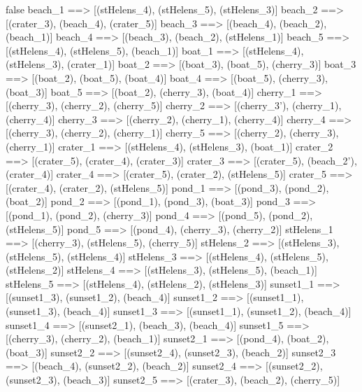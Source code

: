 \if false
beach_1 ==> [(stHelens_4), (stHelens_5), (stHelens_3)]
beach_2 ==> [(crater_3), (beach_4), (crater_5)]
beach_3 ==> [(beach_4), (beach_2), (beach_1)]
beach_4 ==> [(beach_3), (beach_2), (stHelens_1)]
beach_5 ==> [(stHelens_4), (stHelens_5), (beach_1)]
boat_1 ==> [(stHelens_4), (stHelens_3), (crater_1)]
boat_2 ==> [(boat_3), (boat_5), (cherry_3)]
boat_3 ==> [(boat_2), (boat_5), (boat_4)]
boat_4 ==> [(boat_5), (cherry_3), (boat_3)]
boat_5 ==> [(boat_2), (cherry_3), (boat_4)]
cherry_1 ==> [(cherry_3), (cherry_2), (cherry_5)]
cherry_2 ==> [(cherry_3'), (cherry_1), (cherry_4)]
cherry_3 ==> [(cherry_2), (cherry_1), (cherry_4)]
cherry_4 ==> [(cherry_3), (cherry_2), (cherry_1)]
cherry_5 ==> [(cherry_2), (cherry_3), (cherry_1)]
crater_1 ==> [(stHelens_4), (stHelens_3), (boat_1)]
crater_2 ==> [(crater_5), (crater_4), (crater_3)]
crater_3 ==> [(crater_5), (beach_2'), (crater_4)]
crater_4 ==> [(crater_5), (crater_2), (stHelens_5)]
crater_5 ==> [(crater_4), (crater_2), (stHelens_5)]
pond_1 ==> [(pond_3), (pond_2), (boat_2)]
pond_2 ==> [(pond_1), (pond_3), (boat_3)]
pond_3 ==> [(pond_1), (pond_2), (cherry_3)]
pond_4 ==> [(pond_5), (pond_2), (stHelens_5)]
pond_5 ==> [(pond_4), (cherry_3), (cherry_2)]
stHelens_1 ==> [(cherry_3), (stHelens_5), (cherry_5)]
stHelens_2 ==> [(stHelens_3), (stHelens_5), (stHelens_4)]
stHelens_3 ==> [(stHelens_4), (stHelens_5), (stHelens_2)]
stHelens_4 ==> [(stHelens_3), (stHelens_5), (beach_1)]
stHelens_5 ==> [(stHelens_4), (stHelens_2), (stHelens_3)]
sunset1_1 ==> [(sunset1_3), (sunset1_2), (beach_4)]
sunset1_2 ==> [(sunset1_1), (sunset1_3), (beach_4)]
sunset1_3 ==> [(sunset1_1), (sunset1_2), (beach_4)]
sunset1_4 ==> [(sunset2_1), (beach_3), (beach_4)]
sunset1_5 ==> [(cherry_3), (cherry_2), (beach_1)]
sunset2_1 ==> [(pond_4), (boat_2), (boat_3)]
sunset2_2 ==> [(sunset2_4), (sunset2_3), (beach_2)]
sunset2_3 ==> [(beach_4), (sunset2_2), (beach_2)]
sunset2_4 ==> [(sunset2_2), (sunset2_3), (beach_3)]
sunset2_5 ==> [(crater_3), (beach_2), (cherry_5)]
\fi


